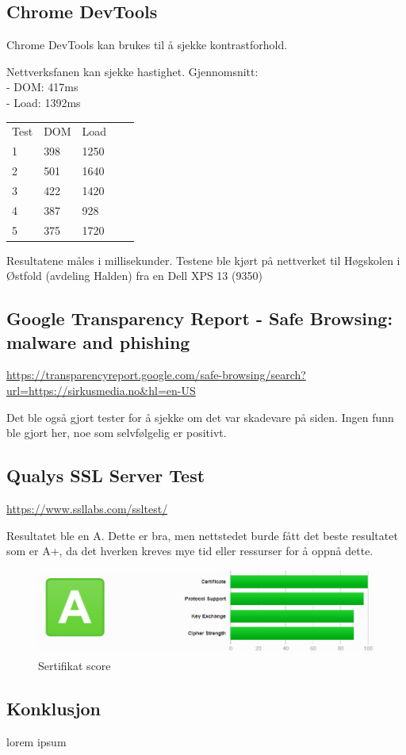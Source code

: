 \subsection{Chrome DevTools}

Chrome DevTools kan brukes til å sjekke kontrastforhold.

Nettverksfanen kan sjekke hastighet.
Gjennomsnitt:\\
- DOM: 417ms\\
- Load: 1392ms

\begin{table}[H]
\begin{tabular}{lllll}
Test & DOM & Load &  &  \\
1 & 398 & 1250 &  &  \\
2 & 501 & 1640 &  &  \\
3 & 422 & 1420 &  &  \\
4 & 387 &  928 &  &  \\
5 & 375 & 1720 &  & 
\end{tabular}
\end{table}

Resultatene måles i millisekunder. Testene ble kjørt på nettverket til Høgskolen i Østfold (avdeling Halden) fra en Dell XPS 13 (9350)

\subsection{Google Transparency Report - Safe Browsing: malware and phishing}
\url{https://transparencyreport.google.com/safe-browsing/search?url=https://sirkusmedia.no&hl=en-US}

Det ble også gjort tester for å sjekke om det var skadevare på siden.
Ingen funn ble gjort her, noe som selvfølgelig er positivt.

\subsection{Qualys SSL Server Test}
\url{https://www.ssllabs.com/ssltest/}

Resultatet ble en A. Dette er bra, men nettstedet burde fått det beste resultatet som er A+, da det hverken kreves mye tid eller ressurser for å oppnå dette.

\begin{figure}[H]
    \centering
    \includegraphics[width=\textwidth]{bjornar/ssllabs.png}
    \caption{Sertifikat score}
    \label{fig:analysis-current-ssl}
\end{figure}

\subsection{Konklusjon}
lorem ipsum

\clearpage